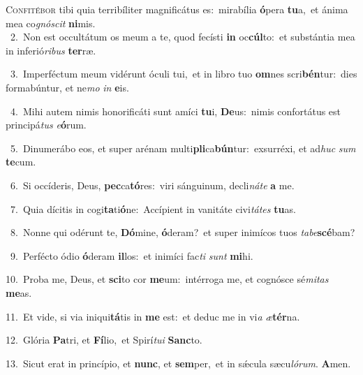 \lettrine{\initial\textcolor{\initialcolor}{C}}{onfitébor} tibi quia terribíliter magnificátus es:~\dagger mirabília \textbf{ó}\-pera \textbf{tu}\-a,~\star et ánima mea co\-\textit{gnó}\-\textit{scit} \textbf{ni}\-mis.\\
{\numbfont\textcolor{\numbcolor}{~2.}}~Non est occultátum os meum a te, quod fecísti \textbf{in} oc\-\textbf{cúl}\-to:~\star et substántia mea in inferió\-\textit{ri}\-\textit{bus} \textbf{ter}\-ræ.\par
{\numbfont\textcolor{\numbcolor}{~3.}}~Imperféctum meum vidérunt óculi tui,~\dagger et in libro tuo \textbf{om}\-nes scri\-\textbf{bén}\-tur:~\star dies formabúntur, et ne\textit{mo} \textit{in} \textbf{e}\-is.\par
{\numbfont\textcolor{\numbcolor}{~4.}}~Mihi autem nimis honorificáti sunt amíci \textbf{tu}\-i, \textbf{De}\-us:~\star nimis confortátus est principá\textit{tus} \textit{e}\-\textbf{ó}rum.\par
{\numbfont\textcolor{\numbcolor}{~5.}}~Dinumerábo eos, et super arénam multi\-\textbf{pli}\-ca\-\textbf{bún}\-tur:~\star exsurréxi, et ad\textit{huc} \textit{sum} \textbf{te}\-cum.\par
{\numbfont\textcolor{\numbcolor}{~6.}}~Si occíderis, Deus, \textbf{pec}\-ca\-\textbf{tó}\-res:~\star viri sánguinum, decli\-\textit{ná}\-\textit{te} \textbf{a} me.\par
{\numbfont\textcolor{\numbcolor}{~7.}}~Quia dícitis in cogi\-\textbf{ta}\-ti\-\textbf{ó}\-ne:~\star Accípient in vanitáte civi\-\textit{tá}\-\textit{tes} \textbf{tu}\-as.\par
{\numbfont\textcolor{\numbcolor}{~8.}}~Nonne qui odérunt te, \textbf{Dó}\-mine, \textbf{ó}\-deram?~\star et super inimícos tuos \textit{ta}\-\textit{be}\textbf{scé}bam?\par
{\numbfont\textcolor{\numbcolor}{~9.}}~Perfécto ódio \textbf{ó}\-deram \textbf{il}\-los:~\star et inimíci fac\textit{ti} \textit{sunt} \textbf{mi}\-hi.\par
{\numbfont\textcolor{\numbcolor}{10.}}~Proba me, Deus, et \textbf{sci}\-to cor \textbf{me}\-um:~\star intérroga me, et cognósce sé\-\textit{mi}\-\textit{tas} \textbf{me}\-as.\par
{\numbfont\textcolor{\numbcolor}{11.}}~Et vide, si via iniqui\-\textbf{tá}\-tis in \textbf{me} est:~\star et deduc me in vi\textit{a} \textit{æ}\-\textbf{tér}na.\par
{\numbfont\textcolor{\numbcolor}{12.}}~Glória \textbf{Pa}\-tri, et \textbf{Fí}\-lio,~\star et Spirí\-\textit{tu}\-\textit{i} \textbf{Sanc}\-to.\par
{\numbfont\textcolor{\numbcolor}{13.}}~Sicut erat in princípio, et \textbf{nunc}\-, et \textbf{sem}\-per,~\star et in sǽcula sæcu\-\textit{ló}\-\textit{rum}. \textbf{A}\-men.\par
